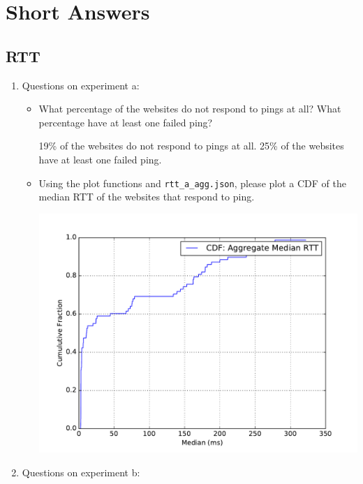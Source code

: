 \documentclass[10pt]{article}
\begin{document}
\section*{Short Answers}

\subsection*{RTT}

\begin{enumerate}
\item Questions on experiment a:

\begin{itemize}
\item What percentage of the websites do not respond to pings at all? What percentage have at least one failed ping?

19\% of the websites do not respond to pings at all. 25\% of the websites have at least one failed ping.

\item Using the plot functions and \texttt{rtt\_a\_agg.json}, please plot a CDF of the median RTT of the websites that respond to ping.

\begin{center}
\includegraphics[scale=0.5]{rtt_a}
\end{center}

\end{itemize}

\item Questions on experiment b:

\begin{itemize}


\end{itemize}
\end{enumerate}
\end{document}
